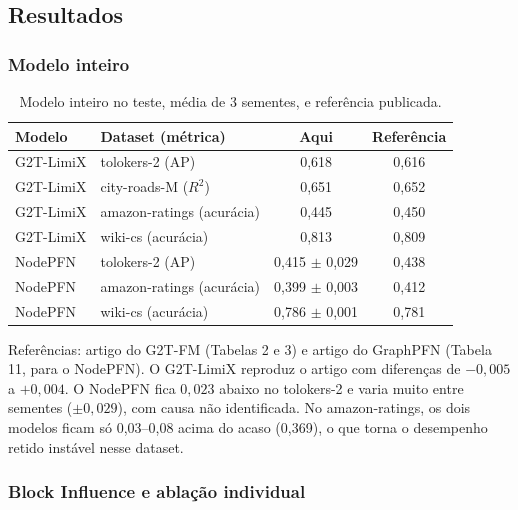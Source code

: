 \documentclass[12pt,a4paper]{article}
\begin{document}
\subsection{Resultados}

\subsubsection{Modelo inteiro}

\begin{table}[H]
\centering
\caption{Modelo inteiro no teste, média de 3 sementes, e referência publicada.}
\label{tab:novos-inteiro}
\begin{tabular}{@{}llcc@{}}
\toprule
Modelo & Dataset (métrica) & Aqui & Referência \\
\midrule
G2T-LimiX & tolokers-2 (AP)           & 0,618 & 0,616 \\
G2T-LimiX & city-roads-M ($R^2$)      & 0,651 & 0,652 \\
G2T-LimiX & amazon-ratings (acurácia) & 0,445 & 0,450 \\
G2T-LimiX & wiki-cs (acurácia)        & 0,813 & 0,809 \\
\midrule
NodePFN   & tolokers-2 (AP)           & 0,415 $\pm$ 0,029 & 0,438 \\
NodePFN   & amazon-ratings (acurácia) & 0,399 $\pm$ 0,003 & 0,412 \\
NodePFN   & wiki-cs (acurácia)        & 0,786 $\pm$ 0,001 & 0,781 \\
\bottomrule
\end{tabular}
\end{table}

\noindent Referências: artigo do G2T-FM (Tabelas 2 e 3) e artigo do GraphPFN (Tabela 11, para o NodePFN). O G2T-LimiX reproduz o artigo com diferenças de $-0{,}005$ a $+0{,}004$. O NodePFN fica $0{,}023$ abaixo no tolokers-2 e varia muito entre sementes ($\pm 0{,}029$), com causa não identificada. No amazon-ratings, os dois modelos ficam só 0,03--0,08 acima do acaso (0,369), o que torna o desempenho retido instável nesse dataset.

\subsubsection{Block Influence e ablação individual}
\end{document}

